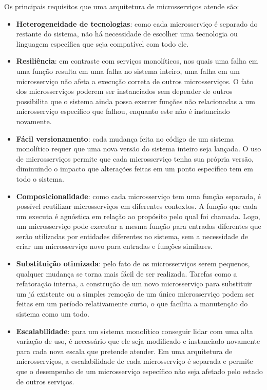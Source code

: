 Os principais requisitos que uma arquitetura de microsserviços atende são:
\begin{itemize}
\item \textbf{Heterogeneidade de tecnologias}: como cada microsserviço é separado do restante do sistema, não há necessidade de escolher uma tecnologia ou linguagem específica que seja compatível com todo ele. 
\item \textbf{Resiliência}: em contraste com serviços monolíticos, nos quais uma falha em uma função resulta em uma falha no sistema inteiro, uma falha em um microsserviço não afeta a execução correta de outros microsserviços. O fato dos microsserviços poderem ser instanciados sem depender de outros possibilita que o sistema ainda possa exercer funções não relacionadas a um microsserviço específico que falhou, enquanto este não é instanciado novamente. 
\item \textbf{Fácil versionamento}: cada mudança feita no código de um sistema monolítico requer que uma nova versão do sistema inteiro seja lançada. O uso de microsserviços permite que cada microsserviço tenha sua própria versão, diminuindo o impacto que alterações feitas em um ponto específico tem em todo o sistema. 
\item \textbf{Composicionalidade}: como cada microsserviço tem uma função separada, é possível reutilizar microsserviços em diferentes contextos. A função que cada um executa é agnóstica em relação ao propósito pelo qual foi chamada. Logo, um microsserviço pode executar a mesma função para entradas diferentes que serão utilizadas por entidades diferentes no sistema, sem a necessidade de criar um microsserviço novo para entradas e funções similares. 
\item \textbf{Substituição otimizada}: pelo fato de os microsserviços serem pequenos, qualquer mudança se torna mais fácil de ser realizada. Tarefas como a refatoração interna, a construção de um novo microsserviço para substituir um já existente ou a simples remoção de um único microsserviço podem ser feitas em um período relativamente curto, o que facilita a manutenção do sistema como um todo. 
\item \textbf{Escalabilidade}: para um sistema monolítico conseguir lidar com uma alta variação de uso, é necessário que ele seja modificado e instanciado novamente para cada nova escala que pretende atender. Em uma arquitetura de microsserviços, a escalabilidade de cada microsserviço é separada e permite que o desempenho de um microsserviço específico não seja afetado pelo estado de outros serviços. 
\end{itemize}

